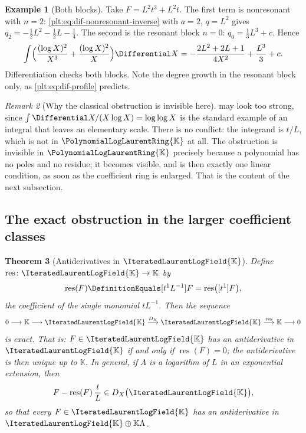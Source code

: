 \documentclass[11pt,oneside]{article}
\theoremstyle{plain}
\newtheorem{theorem}{Theorem}[section]
\theoremstyle{definition}
\newtheorem{example}[theorem]{Example}
\theoremstyle{remark}
\newtheorem{remark}[theorem]{Remark}
\newcommand{\K}{\mathbb{K}}
\newcommand{\PLlau}{\PolynomialLogLaurentRing{\K}}       %
\newcommand{\PLit}{\IteratedLaurentLogField{\K}}         %
\newcommand{\DX}{D_{X}}                                  %
\begin{document}
\begin{example}[Both blocks]\label{plt:ex:dif-antiderivative}
Take \(F=L^{2}t^{3}+L^{2}t\).  The first term is nonresonant with \(n=2\):
\cref{plt:eq:dif-nonresonant-inverse} with \(a=2\), \(q=L^{2}\) gives
\(q_{2}=-\tfrac12L^{2}-\tfrac12L-\tfrac14\).  The second is the resonant block
\(n=0\): \(q_{0}=\tfrac13L^{3}+c\).  Hence
\[
  \int\Bigl(\frac{(\log X)^{2}}{X^{3}}+\frac{(\log X)^{2}}{X}\Bigr)
  \Differential X
  =-\frac{2L^{2}+2L+1}{4X^{2}}+\frac{L^{3}}{3}+c .
\]
Differentiation checks both blocks.  Note the degree growth in the resonant
block only, as \cref{plt:eq:dif-profile} predicts.
\end{example}

\begin{remark}[Why the classical obstruction is invisible here]
\label{plt:rmk:dif-invisible}
 may look too strong, since
\(\int\Differential X/(X\log X)=\log\log X\) is the standard example of an
integral that leaves an elementary scale.  There is no conflict: the integrand
is \(t/L\), which is not in \(\PLlau\) at all.  The obstruction is invisible in
\(\PLlau\) precisely because a polynomial has no poles and no residue; it
becomes visible, and is then exactly one linear condition, as soon as the
coefficient ring is enlarged.  That is the content of the next subsection.
\end{remark}

\subsection{The exact obstruction in the larger coefficient classes}
\label{plt:sec:dif-obstruction}

\begin{theorem}[Antiderivatives in \(\PLit\)]\label{plt:thm:dif-anti-it}
Define \(\operatorname{res}\colon\PLit\to\K\) by
\begin{equation}\label{plt:eq:dif-res-functional}
  \operatorname{res}(F)\DefinitionEquals[t^{1}L^{-1}]F
  =\operatorname{res}\bigl([t^{1}]F\bigr),
\end{equation}
the coefficient of the single monomial \(tL^{-1}\).  Then the sequence
\begin{equation}\label{plt:eq:dif-exact-it}
  0\longrightarrow\K\longrightarrow\PLit
  \stackrel{\DX}{\longrightarrow}\PLit
  \stackrel{\operatorname{res}}{\longrightarrow}\K\longrightarrow0
\end{equation}
is exact.  That is: \(F\in\PLit\) has an antiderivative in \(\PLit\) if and
only if \(\operatorname{res}(F)=0\); the antiderivative is then unique up to
\(\K\).  In general, if \(\Lambda\) is a logarithm of \(L\) in an exponential
extension, then
\begin{equation}\label{plt:eq:dif-anti-with-Lambda}
  F-\operatorname{res}(F)\,\frac{t}{L}\in\DX\bigl(\PLit\bigr),
\end{equation}
so that every \(F\in\PLit\) has an antiderivative in
\(\PLit\oplus\K\Lambda\).
\end{theorem}
\end{document}
